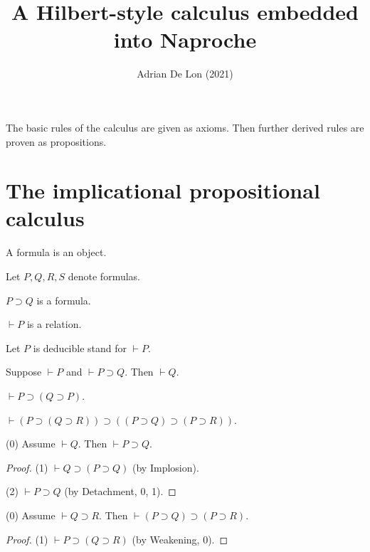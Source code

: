 \documentclass{stex}
\title{A Hilbert-style calculus embedded into Naproche}
\author{Adrian De Lon (2021)}
\date{}
\newcommand{\imp}{\supset}
\newcommand{\deducible}{\vdash}
\begin{document}

\maketitle

The basic rules of the calculus are given as axioms.
Then further derived rules are proven as propositions.

\section{The implicational propositional calculus}

\begin{forthel}

\begin{signature}
    A formula is an object.
\end{signature}
Let $P, Q, R, S$ denote formulas.

\begin{signature}
    $P \imp Q$ is a formula.
\end{signature}

\begin{signature}
    $\deducible P$ is a relation.
\end{signature}
Let $P$ is deducible stand for $\deducible P$.

\begin{axiom}[Detachment]
    Suppose $\deducible P$ and $\deducible P \imp Q$.
    Then $\deducible Q$.
\end{axiom}

\begin{axiom}[Implosion]
    $\deducible P \imp (Q \imp P)$.
\end{axiom}

\begin{axiom}[Chain]
    $\deducible (P \imp (Q \imp R)) \imp ((P \imp Q) \imp (P \imp R))$.
\end{axiom}

\begin{proposition}[Weakening]
    (0) Assume $\deducible Q$.
    Then $\deducible P\imp Q$.
\end{proposition}
\begin{proof}
    (1) $\deducible Q\imp (P\imp Q)$ (by Implosion).

    (2) $\deducible P\imp Q$ (by Detachment, 0, 1).
\end{proof}

\begin{proposition}
    (0) Assume $\deducible Q\imp R$.
    Then $\deducible (P\imp Q)\imp (P \imp R)$.
\end{proposition}
\begin{proof}
    (1) $\deducible P\imp (Q\imp R)$ (by Weakening, 0).


\end{proof}
\end{forthel}
\end{document}

